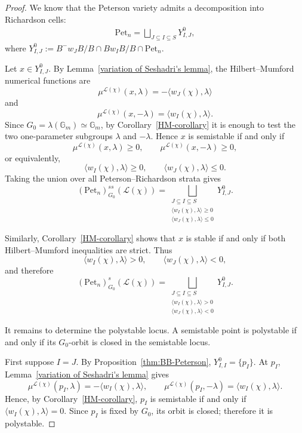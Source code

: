 \documentclass[12pt, reqno]{amsart}
\theoremstyle{plain}
\numberwithin{equation}{section}
\theoremstyle{definition}
\begin{document}
\begin{proof}
We know that the Peterson variety admits a decomposition into Richardson cells:
\begin{align}\label{Section 3: Eq 3.1.1}
    \mathrm{Pet}_{n} = \bigsqcup_{J \subseteq I \subseteq S} Y^{0}_{I,J}, 
\end{align}
where $Y^0_{I,J} := B^-w_{J}B/B \cap Bw_{I}B/B \cap \mathrm{Pet}_n$. 

Let \(x\in Y^0_{I,J}\). By
Lemma~\ref{variation of Seshadri's lemma}, the
Hilbert--Mumford numerical functions are
\[
\mu^{\mathcal L(\chi)}(x,\lambda)
=
-\langle w_J(\chi),\lambda\rangle
\]
and
\[
\mu^{\mathcal L(\chi)}(x,-\lambda)
=
\langle w_I(\chi),\lambda\rangle.
\]
Since \(G_0=\lambda(\mathbb G_m)\simeq\mathbb G_m\), by
Corollary~\ref{HM-corollary} it is enough to test the two
one-parameter subgroups \(\lambda\) and \(-\lambda\). Hence \(x\) is
semistable if and only if
\[
\mu^{\mathcal L(\chi)}(x,\lambda)\ge0,
\qquad
\mu^{\mathcal L(\chi)}(x,-\lambda)\ge0,
\]
or equivalently,
\[
\langle w_I(\chi),\lambda\rangle\ge0,
\qquad
\langle w_J(\chi),\lambda\rangle\le0.
\]
Taking the union over all Peterson--Richardson strata gives
\[
(\mathrm{Pet}_n)^{ss}_{G_0}(\mathcal L(\chi))
=
\bigsqcup_{\substack{J\subseteq I\subseteq S\\
\langle w_I(\chi),\lambda\rangle\ge0\\
\langle w_J(\chi),\lambda\rangle\le0}}
Y^0_{I,J}.
\]

Similarly, Corollary~\ref{HM-corollary} shows that \(x\) is stable if
and only if both Hilbert--Mumford inequalities are strict. Thus
\[
\langle w_I(\chi),\lambda\rangle>0,
\qquad
\langle w_J(\chi),\lambda\rangle<0,
\]
and therefore
\[
(\mathrm{Pet}_n)^s_{G_0}(\mathcal L(\chi))
=
\bigsqcup_{\substack{J\subseteq I\subseteq S\\
\langle w_I(\chi),\lambda\rangle>0\\
\langle w_J(\chi),\lambda\rangle<0}}
Y^0_{I,J}.
\]

It remains to determine the polystable locus. A semistable point is
polystable if and only if its \(G_0\)-orbit is closed in the
semistable locus.

First suppose \(I=J\). By
Proposition~\ref{thm:BB-Peterson}, $Y^0_{I,I}=\{p_I\}.$
At \(p_I\), Lemma~\ref{variation of Seshadri's lemma} gives
\[
\mu^{\mathcal L(\chi)}(p_I,\lambda)
=
-\langle w_I(\chi),\lambda\rangle,
\qquad
\mu^{\mathcal L(\chi)}(p_I,-\lambda)
=
\langle w_I(\chi),\lambda\rangle.
\]
Hence, by Corollary~\ref{HM-corollary}, \(p_I\) is semistable if and
only if $\langle w_I(\chi),\lambda\rangle=0.$
Since \(p_I\) is fixed by \(G_0\), its orbit is closed; therefore it is
polystable.


\end{proof}
\end{document}
